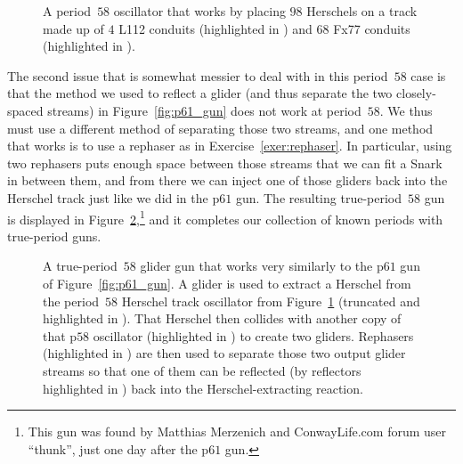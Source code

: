 \begin{figure}[!htb]
	\centering
	\caption{A period~$58$ oscillator that works by placing $98$ Herschels on a track made up of $4$ L112 conduits (highlighted in ) and $68$ Fx77 conduits (highlighted in ).}\label{fig:p58_herschel_track}
\end{figure}

The second issue that is somewhat messier to deal with in this period~$58$ case is that the method we used to reflect a glider (and thus separate the two closely-spaced streams) in Figure~\ref{fig:p61_gun} does not work at period~$58$. We thus must use a different method of separating those two streams, and one method that works is to use a rephaser as in Exercise~\ref{exer:rephaser}. In particular, using two rephasers puts enough space between those streams that we can fit a Snark in between them, and from there we can inject one of those gliders back into the Herschel track just like we did in the p$61$ gun. The resulting true-period~$58$ gun is displayed in Figure~\ref{fig:p58_gun},\footnote{This gun was found by Matthias Merzenich and ConwayLife.com forum user ``thunk'', just one day after the p$61$ gun.} and it completes our collection of known periods with true-period guns.

\begin{figure}[!htb]
	\centering
	\caption{A true-period~$58$ glider gun that works very similarly to the p$61$ gun of Figure~\ref{fig:p61_gun}. A glider is used to extract a Herschel from the period~$58$ Herschel track oscillator from Figure~\ref{fig:p58_herschel_track} (truncated and highlighted in ). That Herschel then collides with another copy of that p$58$ oscillator (highlighted in ) to create two gliders. Rephasers (highlighted in ) are then used to separate those two output glider streams so that one of them can be reflected (by reflectors highlighted in ) back into the Herschel-extracting reaction.}\label{fig:p58_gun}
\end{figure}




